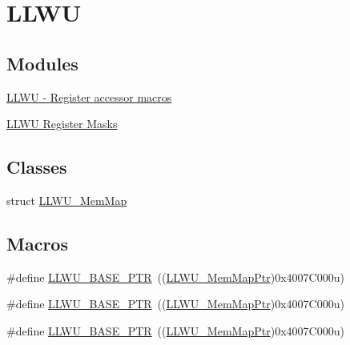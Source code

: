 \hypertarget{group___l_l_w_u___peripheral}{}\section{L\+L\+WU}
\label{group___l_l_w_u___peripheral}
\subsection*{Modules}
\begin{DoxyCompactItemize}
\item 
\hyperlink{group___l_l_w_u___register___accessor___macros}{L\+L\+W\+U -\/ Register accessor macros}
\item 
\hyperlink{group___l_l_w_u___register___masks}{L\+L\+W\+U Register Masks}
\end{DoxyCompactItemize}
\subsection*{Classes}
\begin{DoxyCompactItemize}
\item 
struct \hyperlink{struct_l_l_w_u___mem_map}{L\+L\+W\+U\+\_\+\+Mem\+Map}
\end{DoxyCompactItemize}
\subsection*{Macros}
\begin{DoxyCompactItemize}
\item 
\#define \hyperlink{group___l_l_w_u___peripheral_ga89c97b9e8756088cb3d8617c022ae6ac}{L\+L\+W\+U\+\_\+\+B\+A\+S\+E\+\_\+\+P\+TR}~((\hyperlink{group___l_l_w_u___peripheral_ga03cfefad45ecbfeb2cd16eb85ccfe186}{L\+L\+W\+U\+\_\+\+Mem\+Map\+Ptr})0x4007\+C000u)
\item 
\#define \hyperlink{group___l_l_w_u___peripheral_ga89c97b9e8756088cb3d8617c022ae6ac}{L\+L\+W\+U\+\_\+\+B\+A\+S\+E\+\_\+\+P\+TR}~((\hyperlink{group___l_l_w_u___peripheral_ga03cfefad45ecbfeb2cd16eb85ccfe186}{L\+L\+W\+U\+\_\+\+Mem\+Map\+Ptr})0x4007\+C000u)
\item 
\#define \hyperlink{group___l_l_w_u___peripheral_ga89c97b9e8756088cb3d8617c022ae6ac}{L\+L\+W\+U\+\_\+\+B\+A\+S\+E\+\_\+\+P\+TR}~((\hyperlink{group___l_l_w_u___peripheral_ga03cfefad45ecbfeb2cd16eb85ccfe186}{L\+L\+W\+U\+\_\+\+Mem\+Map\+Ptr})0x4007\+C000u)
\end{DoxyCompactItemize}
